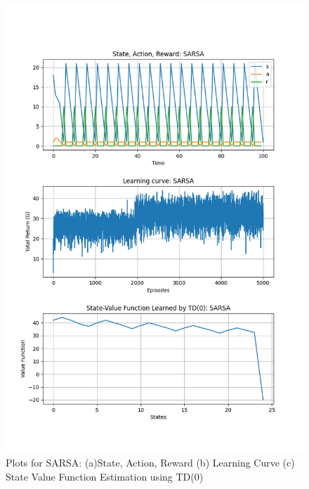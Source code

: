 \documentclass[conf]{new-aiaa}
\begin{document}
\begin{figure}[H]
\centering
\includegraphics[width=30pc]{figs/gw/sarsa_plots.png}
\caption{Plots for SARSA: (a)State, Action, Reward (b) Learning Curve (c) State Value Function Estimation using TD(0)}
\label{fig_env1}
\end{figure}
\end{document}
